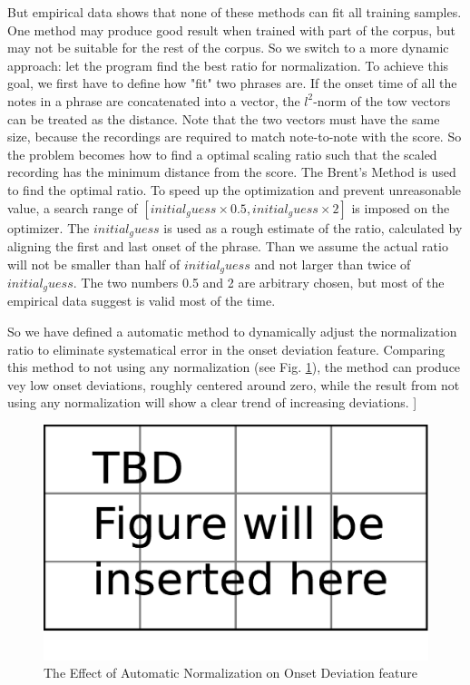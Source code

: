    But empirical data shows that none of these methods can fit all training samples. One method may produce good result when trained with part of the corpus, but may not be suitable for the rest of the corpus. So we switch to a more dynamic approach: let the program find the best ratio for normalization. To achieve this goal, we first have to define how "fit" two phrases are. If the onset time of all the notes in a phrase are concatenated into a vector, the $l^2$-norm of the tow vectors can be treated as the distance. Note that the two vectors must have the same size, because the recordings are required to match note-to-note with the score. So the problem becomes how to find a optimal scaling ratio such that the scaled recording has the minimum distance from the score. The Brent's Method\cite{TODO:brent1973} is used to find the optimal ratio. To speed up the optimization and prevent unreasonable value, a search range of $[initial_guess \times 0.5 , initial_guess \times 2]$ is imposed on the optimizer. The $initial_guess$ is used as a rough estimate of the ratio, calculated by aligning the first and last onset of the phrase. Than we assume the actual ratio will not be smaller than half of $initial_guess$ and not larger than twice of $initial_guess$. The two numbers 0.5 and 2 are arbitrary chosen, but most of the empirical data suggest is valid most of the time. 

   So we have defined a automatic method to dynamically adjust the normalization ratio to eliminate systematical error in the onset deviation feature. Comparing this method to not using any normalization (see Fig. \ref{fig:afternorm}), the method can produce vey low onset deviations, roughly centered around zero, while the result from not using any normalization will show a clear trend of increasing deviations.
]
\begin{figure}[tp]
   \begin{center}
      \includegraphics[width=\textwidth]{fig/TBDFigure}

   \end{center}
   \caption{The Effect of Automatic Normalization on Onset Deviation feature}
   \label{fig:afternorm}
\end{figure}


